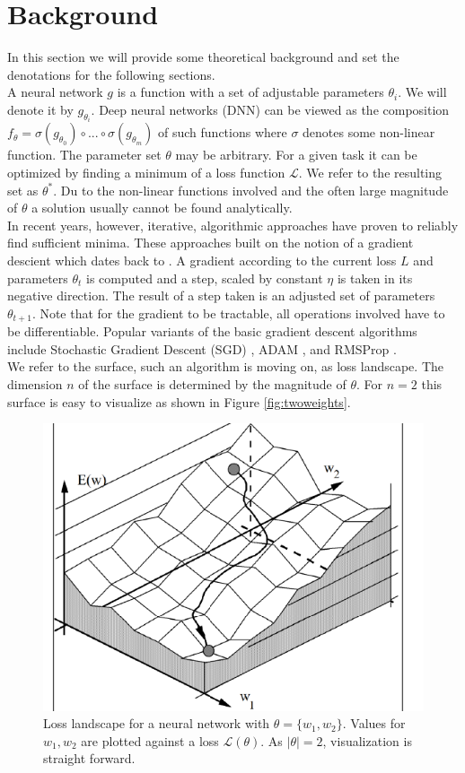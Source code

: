 \documentclass[a4paper]{scrartcl}
\begin{document}
\section*{Background}
In this section we will provide some theoretical background and set the denotations for the following sections.\\
A neural network $g$ is a function with a set of adjustable parameters $\theta_i$. We will denote it by $g_{\theta_i}$. Deep neural networks (DNN) can be viewed as the composition $f_{\theta} = \sigma (g_{\theta_0}) \circ ... \circ \sigma(g_{\theta_m})$ of such functions where $\sigma$ denotes some non-linear function. The parameter set $\theta$ may be arbitrary. For a given task it can be optimized by finding a minimum of a loss function $\mathcal{L}$. We refer to the resulting set as $\theta^*$. Du to the non-linear functions involved and the often large magnitude of $\theta$ a solution usually cannot be found analytically.\\
In recent years, however, iterative, algorithmic approaches have proven to reliably find sufficient minima. These approaches built on the notion of a gradient descient which dates back to \cite{cauchy1847methode}. A gradient according to the current loss $L$ and parameters $\theta_t$ is computed and a step, scaled by constant $\eta$ is taken in its negative direction. The result of a step taken is an adjusted set of parameters $\theta_{t+1}$. Note that for the gradient to be tractable, all operations involved have to be differentiable. Popular variants of the basic gradient descent algorithms include Stochastic Gradient Descent (SGD) \cite{robbins1951stochastic}, ADAM \cite{kingma2014adam}, and RMSProp \cite{graves2013generating}.\\
We refer to the surface, such an algorithm is moving on, as loss landscape. The dimension $n$ of the surface is determined by the magnitude of $\theta$. For $n=2$ this surface is easy to visualize as shown in Figure \ref{fig:twoweights}.

\label{fig:twoweights}
\begin{figure}
	\centering
	\includegraphics[width=.5\linewidth]{figures/two_weight_loss.png}
	\caption{Loss landscape for a neural network with $\theta = \lbrace w_1, w_2 \rbrace$. Values for $w_1, w_2$ are plotted against a loss $\mathcal{L}(\theta)$. As $|\theta| = 2$, visualization is straight forward.}
\end{figure}
\end{document}
